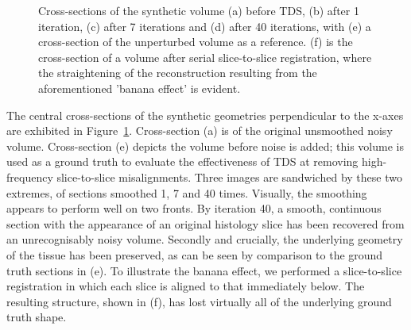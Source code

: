 \begin{figure}[!t]
    \caption{Cross-sections of the synthetic volume (a) before TDS, (b) after 1 iteration, (c) after 7 iterations and (d) after 40 iterations, with (e) a cross-section of the unperturbed volume as a reference. (f) is the cross-section of a volume after serial slice-to-slice registration, where the straightening of the reconstruction resulting from the aforementioned 'banana effect' is evident.}
    \label{fig:synthetic_cross_sections}
  \end{figure}
  The central cross-sections of the synthetic geometries perpendicular to the x-axes are exhibited in Figure~\ref{fig:synthetic_cross_sections}. Cross-section (a) is of the original unsmoothed noisy volume. Cross-section (e) depicts the volume before noise is added; this volume is used as a ground truth to evaluate the effectiveness of TDS at removing high-frequency slice-to-slice misalignments. Three images are sandwiched by these two extremes, of sections smoothed 1, 7 and 40 times. Visually, the smoothing appears to perform well on two fronts. By iteration 40, a smooth, continuous section with the appearance of an original histology slice has been recovered from an unrecognisably noisy volume. Secondly and crucially, the underlying geometry of the tissue has been preserved, as can be seen by comparison to the ground truth sections in (e). To illustrate the banana effect, we performed a slice-to-slice registration in which each slice is aligned to that immediately below. The resulting structure, shown in (f), has lost virtually all of the underlying ground truth shape.
  
